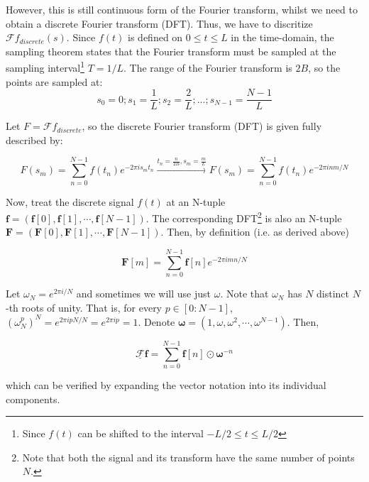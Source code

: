 \documentclass{article}
\begin{document}
However, this is still continuous form of the Fourier transform, whilst we need to obtain a discrete Fourier transform (DFT). Thus, we have to discritize $\mathscr{F}f_{discrete}(s)$. Since $f(t)$ is defined on $0 \le t \le L$ in the time-domain, the sampling theorem states that the Fourier transform must be sampled at the sampling interval\footnote{Since $f(t)$ can be shifted to the interval $-L/2 \le t \le L/2$} $T=1/L$. The range of the Fourier transform is $2B$, so the points are sampled at:
\begin{equation}
    s_0 = 0; s_1 = \frac{1}{L}; s_2 = \frac{2}{L}; ...; s_{N-1} = \frac{N-1}{L}
\end{equation}

Let $F = \mathscr{F}f_{discrete}$, so the discrete Fourier transform (DFT) is given fully described by:

\begin{equation}
    F(s_{m}) = \sum_{n=0}^{N-1} f(t_n) e^{-2\pi i s_m t_n} \xrightarrow{ t_n = \frac{n}{2B}, s_m = \frac{m}{L} } F(s_{m}) = \sum_{n=0}^{N-1} f(t_n) e^{-2\pi inm/N}
\end{equation}

Now, treat the discrete signal $f(t)$ at an N-tuple $\mathbf{f} = \left( \mathbf{f}[0], \mathbf{f}[1], \cdots, \mathbf{f}[N-1] \right)$. The corresponding DFT\footnote{Note that both the signal and its transform have the same number of points $N$.} is also an N-tuple $\mathbf{F} = \left( \mathbf{F}[0], \mathbf{F}[1], \cdots, \mathbf{F}[N-1] \right)$. Then, by definition (i.e. as derived above) 

\begin{equation}
    \mathbf{F}[m] = \sum_{n=0}^{N-1} \mathbf{f}[n] e^{-2\pi imn/N}
\end{equation}

Let $\omega_N = e^{2\pi i / N}$ and sometimes we will use just $\omega$. Note that $\omega_N$ has $N$ distinct $N$-th roots of unity. That is, for every $p \in \left[0:N-1\right]$, $(\omega_N^p)^{N} = e^{2\pi i p N / N} = e^{2\pi ip} = 1$. Denote $\boldsymbol{\omega} = \left( 1, \omega, \omega^2, \cdots, \omega^{N-1} \right)$. Then,

\begin{equation}
    \underline{\mathscr{F}} \mathbf{f} = \sum_{n=0}^{N-1} \mathbf{f}[n] \odot \boldsymbol{\omega}^{-n} 
\end{equation}

which can be verified by expanding the vector notation into its individual components.
\end{document}
